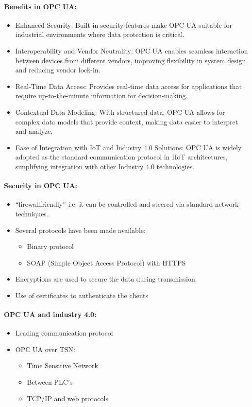 \documentclass[12pt]{article}
\begin{document}
\paragraph{Benefits in OPC UA:}
\begin{itemize}
    \item Enhanced Security: Built-in security features make OPC UA suitable for industrial
    environments where data protection is critical.
    \item Interoperability and Vendor Neutrality: OPC UA enables seamless interaction
    between devices from different vendors, improving flexibility in system design and
    reducing vendor lock-in.
    \item Real-Time Data Access: Provides real-time data access for applications that require
    up-to-the-minute information for decision-making.
    \item Contextual Data Modeling: With structured data, OPC UA allows for complex data
    models that provide context, making data easier to interpret and analyze.
    \item Ease of Integration with IoT and Industry 4.0 Solutions: OPC UA is widely adopted as
    the standard communication protocol in IIoT architectures, simplifying integration
    with other Industry 4.0 technologies.
\end{itemize}
\paragraph{Security in OPC UA:}
\begin{itemize}
    \item “firewallfriendly” i.e. it can be controlled and steered
    via standard network techniques.
    \item Several protocols have been made available:\begin{itemize}
        \item Binary protocol
        \item SOAP (Simple Object Access Protocol) with HTTPS
    \end{itemize}
    \item Encryptions are used to secure the data during
    transmission.
    \item Use of certificates to authenticate the clients
\end{itemize}
\paragraph{OPC UA and industry 4.0:}
\begin{itemize}
    \item Leading communication protocol
    \item OPC UA over TSN:\begin{itemize}
        \item Time Sensitive Network
        \item Between PLC's
        \item TCP/IP and web protocols
    \end{itemize}
\end{itemize}
\end{document}
